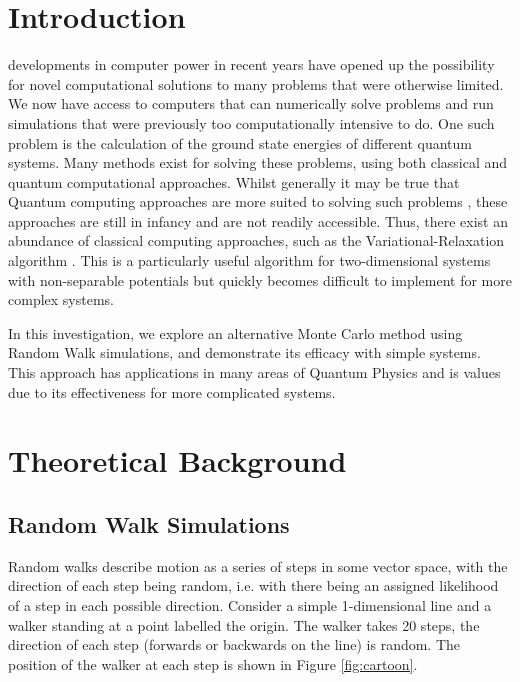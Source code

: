 \documentclass[journal]{IEEEtran}
\begin{document}
\section{Introduction}
 developments in computer power in recent years have opened
up the possibility for novel computational solutions to many problems that were
otherwise limited. We now have access to computers that can numerically solve
problems and run simulations that were previously too computationally intensive
to do.  One such problem is the calculation of the ground state energies of
different quantum systems. Many methods exist for solving these problems, using
both classical and quantum computational approaches. Whilst generally it may be
true that Quantum computing approaches are more suited to solving such problems
\cite{Mazzola}, these approaches are still in infancy and are not readily
accessible. Thus, there exist an abundance of classical computing approaches,
such as the Variational-Relaxation algorithm \cite{Schroeder2017}. This is a
particularly useful algorithm for two-dimensional systems with non-separable
potentials but quickly becomes difficult to implement for more complex systems.

In this investigation, we explore an alternative Monte Carlo method using Random
Walk simulations, and demonstrate its efficacy with simple systems. This
approach has applications in many areas of Quantum Physics and is values due to
its effectiveness for more complicated systems.

\section{Theoretical Background}
\label{sec:TheoreticalBackground}

\subsection{Random Walk Simulations}

Random walks describe motion as a series of steps in some vector space, with the
direction of each step being random, i.e. with there being an assigned likelihood
of a step in each possible direction. Consider a simple 1-dimensional line and a
walker standing at a point labelled the origin. The walker takes 20 steps, the
direction of each step (forwards or backwards on the line) is random. The
position of the walker at each step is shown in Figure \ref{fig:cartoon}.
\end{document}
